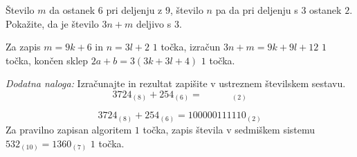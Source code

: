 \documentclass[addpoints]{exam}
\begin{document}
\begin{questions}
    


    \question[3]
    Število $m$ da ostanek $6$ pri deljenju z $9$, število $n$ pa da pri deljenju s $3$ ostanek $2$.
    Pokažite, da je število $3n+m$ deljivo s $3$.
    
    \begin{solution}[3cm]
        Za zapis $m=9k+6$ in $n=3l+2$ $1$ točka, izračun $3n+m=9k+9l+12$ $1$ točka, končen sklep $2a+b=3(3k+3l+4)$ $1$ točka.
    \end{solution}

        




     \newpage

    \bonusquestion[3]
    \textit{Dodatna naloga:} Izračunajte in rezultat zapišite v ustreznem številskem sestavu.
                $$ 3724_{(8)}+ 254_{(6)}= \quad \quad \quad _{(2)} $$

    \begin{solution}[7cm]
        $$ 3724_{(8)}+ 254_{(6)}= 100000111110_{(2)} $$
        Za pravilno zapisan algoritem $1$ točka, zapis števila v sedmiškem sistemu $532_{(10)}=1360_{(7)}$ $1$ točka.
    \end{solution}




\end{questions}
\end{document}
